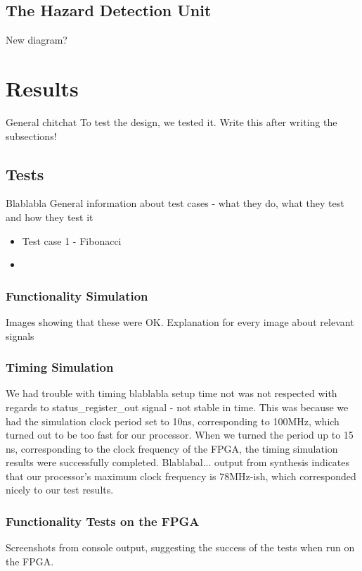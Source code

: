 \documentclass[11pt]{article}
\begin{document}
\subsection{The Hazard Detection Unit}
\label{subsec:hazarddetection} New diagram?

\section{Results}
\label{sec:results} General chitchat To test the design, we tested
it. Write this after writing the subsections!

\subsection{Tests}
\label{subsec:tests}

Blablabla General information about test cases - what they do, what
they test and how they test it

\begin{itemize}
\item Test case 1 - Fibonacci
\item
\end{itemize}

\subsubsection{Functionality Simulation}
\label{subsubsec:funcsim} Images showing that these were
OK. Explanation for every image about relevant signals

\subsubsection{Timing Simulation}
\label{subsubsec:timingsim}

We had trouble with timing blablabla setup time not was not respected
with regards to status_register_out signal - not stable in time. This
was because we had the simulation clock period set to 10ns,
corresponding to 100MHz, which turned out to be too fast for our
processor. When we turned the period up to 15 ns, corresponding to the
clock frequency of the FPGA, the timing simulation results were
successfully completed. Blablabal... output from synthesis indicates
that our processor's maximum clock frequency is 78MHz-ish, which
corresponded nicely to our test results.

\subsubsection{Functionality Tests on the FPGA}
\label{subsec:funcfpga} Screenshots from console output, suggesting
the success of the tests when run on the FPGA.
\end{document}
